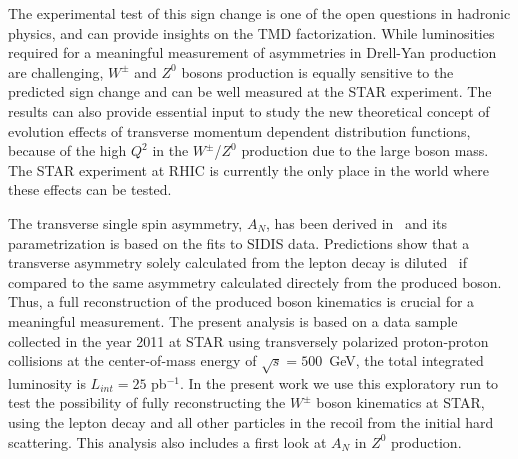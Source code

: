 \documentclass[12pt]{article}
\begin{document}
The experimental test of this sign change is one of the open questions in hadronic physics, and can provide insights on the TMD factorization. While luminosities required for a meaningful measurement of asymmetries in Drell-Yan production are challenging, $W^{\pm}$ and $Z^{0}$ bosons production is equally sensitive to the predicted sign change and can be well measured at the STAR experiment.  The results can also provide essential input to study the new theoretical concept of evolution effects of transverse momentum dependent distribution functions, because of the high $Q^{2}$ in the $W^{\pm}$/$Z^{0}$ production due to the large boson mass. The STAR experiment at RHIC is currently the only place in the world where these effects can be tested.

The transverse single spin asymmetry, $A_N$, has been derived in~\cite{Kang:2009bp} and its parametrization is based on the fits to SIDIS data.
Predictions show that a transverse asymmetry solely calculated from the lepton decay is diluted~\cite{Kang:2009bp} if compared to the same asymmetry calculated directely from the produced boson. 
Thus, a full reconstruction of the produced boson kinematics is crucial for a meaningful measurement.
The present analysis is based on a data sample collected in the year 2011 at STAR using transversely polarized proton-proton collisions at the center-of-mass energy of $\sqrt{s}=500$~GeV, the total integrated luminosity is $L_{int} = 25$ pb$^{-1}$. In the present work we use this exploratory run to test the possibility of fully reconstructing the $W^{\pm}$ boson kinematics at STAR, using the lepton decay and all other particles in the recoil from the initial hard scattering. This analysis also includes a first look at $A_{N}$ in $Z^{0}$ production. 

%
%
%
\end{document}
